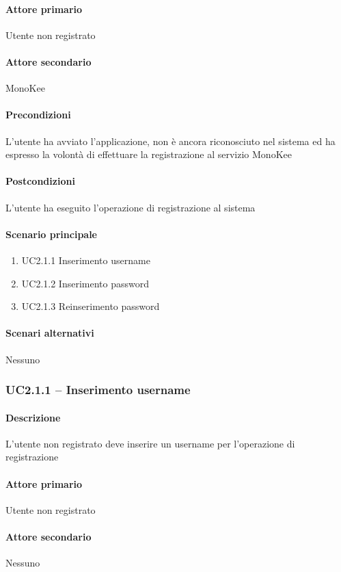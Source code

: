 \paragraph{Attore primario}  Utente non registrato
\paragraph{Attore secondario}  MonoKee
\paragraph{Precondizioni}  L’utente ha avviato l’applicazione, non è ancora riconosciuto nel sistema ed ha espresso la volontà di effettuare la registrazione al servizio MonoKee
\paragraph{Postcondizioni}  L’utente ha eseguito l’operazione di registrazione al sistema
\paragraph{Scenario principale}  
    \begin{enumerate}
        \item UC2.1.1 Inserimento username
        \item UC2.1.2 Inserimento password
        \item UC2.1.3 Reinserimento password
    \end{enumerate}
\paragraph{Scenari alternativi}  Nessuno



\subsubsection{UC2.1.1 – Inserimento username}
\paragraph{Descrizione}  L’utente non registrato deve inserire un username per l’operazione di registrazione
\paragraph{Attore primario}  Utente non registrato
\paragraph{Attore secondario}  Nessuno
